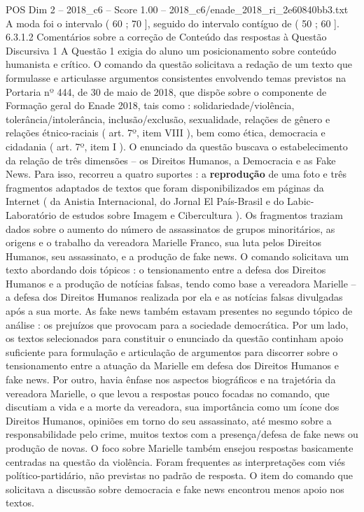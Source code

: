 \begin{textsample}{POS Dim 2 – 2018\_c6 – Score 1.00 – 2018\_c6/enade\_2018\_ri\_2e60840bb3.txt}
A moda foi o intervalo ( 60 ; 70 ], seguido do intervalo contíguo de ( 50 ; 60 ]. 6.3.1.2 Comentários sobre a correção de Conteúdo das respostas à Questão Discursiva 1 A Questão 1 exigia do aluno um posicionamento sobre conteúdo humanista e crítico.
O comando da questão solicitava a redação de um texto que formulasse e articulasse argumentos consistentes envolvendo temas previstos na Portaria nº 444, de 30 de maio de 2018, que dispõe sobre o componente de Formação geral do Enade 2018, tais como : solidariedade/violência, tolerância/intolerância, inclusão/exclusão, sexualidade, relações de gênero e relações étnico-raciais ( art. 7º, item VIII ), bem como ética, democracia e cidadania ( art. 7º, item I ).
O enunciado da questão buscava o estabelecimento da relação de três dimensões – os Direitos Humanos, a Democracia e as Fake News.
Para isso, recorreu a quatro suportes : a \textbf{reprodução} de uma foto e três fragmentos adaptados de textos que foram disponibilizados em páginas da Internet ( da Anistia Internacional, do Jornal El País-Brasil e do Labic-Laboratório de estudos sobre Imagem e Cibercultura ).
Os fragmentos traziam dados sobre o aumento do número de assassinatos de grupos minoritários, as origens e o trabalho da vereadora Marielle Franco, sua luta pelos Direitos Humanos, seu assassinato, e a produção de fake news.
O comando solicitava um texto abordando dois tópicos : o tensionamento entre a defesa dos Direitos Humanos e a produção de notícias falsas, tendo como base a vereadora Marielle – a defesa dos Direitos Humanos realizada por ela e as notícias falsas divulgadas após a sua morte.
As fake news também estavam presentes no segundo tópico de análise : os prejuízos que provocam para a sociedade democrática.
Por um lado, os textos selecionados para constituir o enunciado da questão continham apoio suficiente para formulação e articulação de argumentos para discorrer sobre o tensionamento entre a atuação da Marielle em defesa dos Direitos Humanos e fake news.
Por outro, havia ênfase nos aspectos biográficos e na trajetória da vereadora Marielle, o que levou a respostas pouco focadas no comando, que discutiam a vida e a morte da vereadora, sua importância como um ícone dos Direitos Humanos, opiniões em torno do seu assassinato, até mesmo sobre a responsabilidade pelo crime, muitos textos com a presença/defesa de fake news ou produção de novas.
O foco sobre Marielle também ensejou respostas basicamente centradas na questão da violência.
Foram frequentes as interpretações com viés político-partidário, não previstas no padrão de resposta.
O item do comando que solicitava a discussão sobre democracia e fake news encontrou menos apoio nos textos.

\end{textsample}
